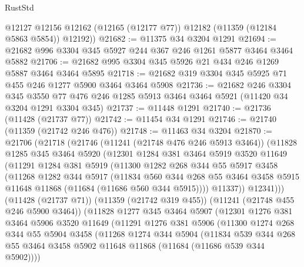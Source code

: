 \begin{lexlean}{RustStd}
\begin{coremodule}
{{{{{{{{{{{{{{{{{{{        @12127
        @12156
        @12162
        (@12165 (@12177 @77))
        @12182
        (@11359 (@12184 @5863 @5854))
        @12192))
@21682 := @11375 @34 @3204 @1291
@21694 := @21682 @996 @3304 @345 @5927 @244 @367 @246 @1261 @5877 @3464 @3464 @5882
@21706 := @21682 @995 @3304 @345 @5926 @21 @434 @246 @1269 @5887 @3464 @3464 @5895
@21718 := @21682 @319 @3304 @345 @5925 @71 @455 @246 @1277 @5900 @3464 @3464 @5908
@21736 := @21682
    @246
    @3304
    @345
    @3550
    @77
    @476
    @246
    @1285
    @5913
    @3464
    @3464
    @5921
    (@11420 @34 @3204 @1291 @3304 @345)
@21737 := @11448 @1291
@21740 := @21736 (@11428 (@21737 @77))
@21742 := @11454 @34 @1291
@21746 := @21740 (@11359 (@21742 @246 @476))
@21748 := @11463 @34 @3204
@21870 := @21706
    (@21718
      (@21746
        (@11241 (@21748 @476 @246 @5913 @3464))
        (@11828
          @1285
          @345
          @3464
          @5920
          (@12301
            @1284
            @381
            @3464
            @5919
            @3520
            @11649
            (@11291
              @1284
              @381
              @5919
              (@11300
                @1282
                @268
                @344
                @55
                @5917
                @3458
                (@11268
                  @1282
                  @344
                  @5917
                  (@11834
                    @560
                    @344
                    @268
                    @55
                    @3464
                    @3458
                    @5915
                    @11648
                    @11868
                    (@11684 (@11686 @560 @344 @5915))))
                @11337))
            @12341)))
      (@11428 (@21737 @71))
      (@11359 (@21742 @319 @455))
      (@11241 (@21748 @455 @246 @5900 @3464))
      (@11828
        @1277
        @345
        @3464
        @5907
        (@12301
          @1276
          @381
          @3464
          @5906
          @3520
          @11649
          (@11291
            @1276
            @381
            @5906
            (@11300
              @1274
              @268
              @344
              @55
              @5904
              @3458
              (@11268
                @1274
                @344
                @5904
                (@11834
                  @539
                  @344
                  @268
                  @55
                  @3464
                  @3458
                  @5902
                  @11648
                  @11868
                  (@11684 (@11686 @539 @344 @5902))))
}}}}}}}}}}}}}}}}}}}
\end{coremodule}
\end{lexlean}
